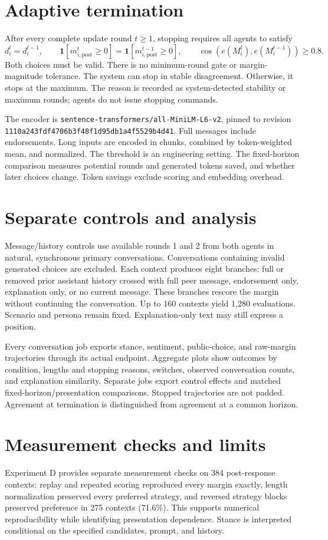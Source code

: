 \documentclass[11pt,a4paper]{article}
\begin{document}
\section{Adaptive termination}
After every complete update round $t\geq1$, stopping requires all agents to satisfy
\[
d_i^t=d_i^{t-1},\qquad
\mathbf{1}[m_{i,\mathrm{post}}^t\geq0]=\mathbf{1}[m_{i,\mathrm{post}}^{t-1}\geq0],\qquad
\cos\!\left(e(M_i^t),e(M_i^{t-1})\right)\geq0.8.
\]
Both choices must be valid. There is no minimum-round gate or margin-magnitude tolerance. The system can stop in stable disagreement. Otherwise, it stops at the maximum. The reason is recorded as system-detected stability or maximum rounds; agents do not issue stopping commands.

The encoder is \texttt{sentence-transformers/all-MiniLM-L6-v2}, pinned to revision \texttt{1110a243fdf4706b3f48f1d95db1a4f5529b4d41}. Full messages include endorsements. Long inputs are encoded in chunks, combined by token-weighted mean, and normalized. The threshold is an engineering setting. The fixed-horizon comparison measures potential rounds and generated tokens saved, and whether later choices change. Token savings exclude scoring and embedding overhead.

\section{Separate controls and analysis}
Message/history controls use available rounds 1 and 2 from both agents in natural, synchronous primary conversations. Conversations containing invalid generated choices are excluded. Each context produces eight branches: full or removed prior assistant history crossed with full peer message, endorsement only, explanation only, or no current message. These branches rescore the margin without continuing the conversation. Up to 160 contexts yield 1,280 evaluations. Scenario and persona remain fixed. Explanation-only text may still express a position.

Every conversation job exports stance, sentiment, public-choice, and raw-margin trajectories through its actual endpoint. Aggregate plots show outcomes by condition, lengths and stopping reasons, switches, observed conversation counts, and explanation similarity. Separate jobs export control effects and matched fixed-horizon/presentation comparisons. Stopped trajectories are not padded. Agreement at termination is distinguished from agreement at a common horizon.

\section{Measurement checks and limits}
Experiment D provides separate measurement checks on 384 post-response contexts: replay and repeated scoring reproduced every margin exactly, length normalization preserved every preferred strategy, and reversed strategy blocks preserved preference in 275 contexts (71.6\%). This supports numerical reproducibility while identifying presentation dependence. Stance is interpreted conditional on the specified candidates, prompt, and history.
\end{document}
